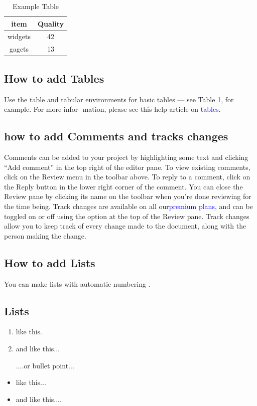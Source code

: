 \documentclass{article} %
\begin{document}
\begin{table}[h]
	\centering
	\begin{tabular}{|c|c|}
	\textbf{item} & \textbf{Quality} \\
		\hline
		widgets &42\\
		gagets &13\\
	\end{tabular}
	\caption{Example Table}
	\label{tab:example}
\subsection{How to add Tables}
Use the table and tabular environments for basic tables — see Table 1, for example. For more infor-
	mation, please see this help article \textcolor{blue}{on tables}.
\subsection{how to add Comments and tracks changes}
Comments can be added to your project by highlighting some text and clicking “Add comment” in
the top right of the editor pane. To view existing comments, click on the Review menu in the toolbar
above. To reply to a comment, click on the Reply button in the lower right corner of the comment.
You can close the Review pane by clicking its name on the toolbar when you’re done reviewing for the
time being.
Track changes are available on all our\textcolor{blue} {premium plans}, and can be toggled on or off using the option
at the top of the Review pane. Track changes allow you to keep track of every change made to the
document, along with the person making the change.
\subsection{How to add Lists}
	You can make lists with automatic numbering .
	\subsection{Lists}
	\begin{enumerate} 
		\item like this.
		\item and like this...
		
		....or bullet point...
		\end{enumerate}
		\begin{itemize}
		
		\item like this...
		\item and like this....
	\end{itemize}

\end{table}
\end{document}
